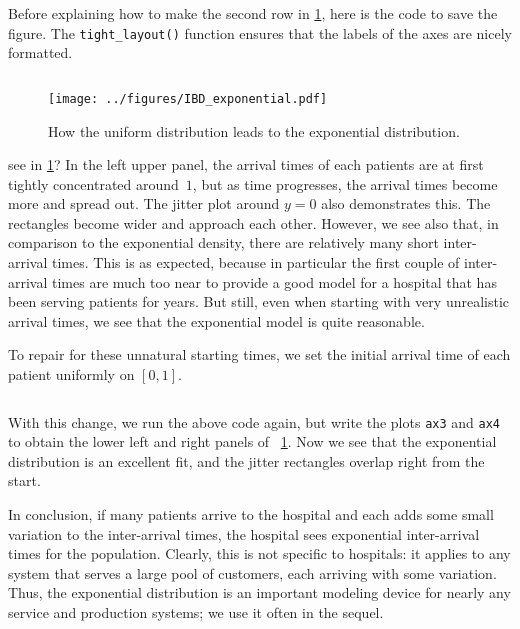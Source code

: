 \documentclass[stochastic-or.tex]{subfiles}
\begin{document}
Before explaining how to make the second row in \cref{fig:unitoexp}, here is the code to save the figure.
The \texttt{tight_layout()} function ensures that the labels of the axes are nicely formatted.
\inputminted[firstline=103, lastline=104]{python}{../code/IBD_simulations.py} %

\begin{figure}[t]
\begin{center}
\texttt{[image: ../figures/IBD\_exponential.pdf]}
\end{center}
\caption{How the uniform distribution leads to the exponential distribution.}
\label{fig:unitoexp}
\end{figure}


 see in \cref{fig:unitoexp}?
In the left upper panel, the arrival times of each patients are at first tightly concentrated around~$1$, but as time progresses, the arrival times become more and spread out.
The jitter plot around $y=0$ also demonstrates this.
The rectangles become wider and approach each other.
However, we see also that, in comparison to the exponential density, there are relatively many short inter-arrival times.
This is as expected, because in particular the first couple of inter-arrival times are much too near to provide a good model for a hospital that has been serving patients for years.
But still, even when starting with very unrealistic arrival times, we see that the exponential model is quite reasonable.


To repair for these unnatural starting times, we set the initial arrival time of each patient uniformly on $[0,1]$.
\inputminted[firstline=78, lastline=78]{python}{../code/IBD_simulations.py} %

With this change, we run the above code again, but write the plots \texttt{ax3} and \texttt{ax4} to obtain the lower left and right panels of ~\cref{fig:unitoexp}.
Now we see that the exponential distribution is an excellent fit, and the jitter rectangles overlap right from the start.

In conclusion, if many patients arrive to the hospital and each adds some small variation to the inter-arrival times, the hospital sees exponential inter-arrival times for the population.
Clearly, this is not specific to hospitals: it applies to any system that serves a large pool of customers, each arriving with some variation.
Thus, the exponential distribution is an important modeling device for nearly any service and production systems; we use it often in the sequel.
\end{document}
